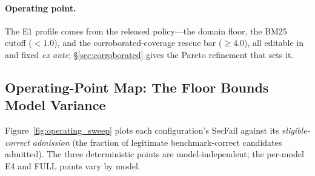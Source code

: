 \documentclass[sigconf,review,anonymous]{acmart}
\begin{document}
\paragraph{Operating point.} The E1 profile comes from the released policy---the  domain floor, the  BM25 cutoff ($<\!1.0$), and the corroborated-coverage rescue bar ($\geq\!4.0$), all editable in  and fixed \emph{ex ante}; \S\ref{sec:corroborated} gives the Pareto refinement that sets it.

\subsection{Operating-Point Map: The Floor Bounds Model Variance}
\label{sec:operating_sweep}

Figure~\ref{fig:operating_sweep} plots each configuration's SecFail against its \emph{eligible-correct admission} (the fraction of legitimate benchmark-correct candidates admitted). The three deterministic points are model-independent; the per-model E4 and FULL points vary by model.
\end{document}
